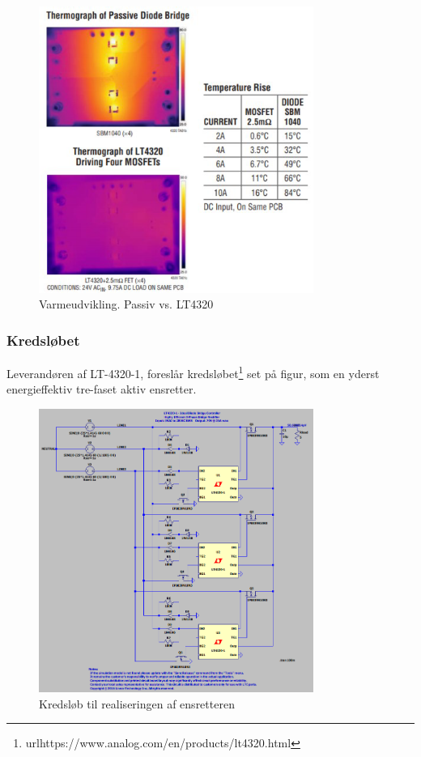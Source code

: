 \begin{figure}[htb]
  \begin{minipage}{\textwidth}
    \centering
    \includegraphics[width=0.8\textwidth]{prens3.png}
    \caption{Varmeudvikling. Passiv vs. LT4320\protect\footnotemark}
    \label{fig:prens3}
  \end{minipage}
\end{figure}

\subsubsection{Kredsløbet}
\label{sec:kredslobet}

Leverandøren af LT-4320-1, foreslår kredsløbet\footnote{url{https://www.analog.com/en/products/lt4320.html}} set på figur, som en yderst energieffektiv tre-faset aktiv ensretter.

\begin{figure}[h]
  \centering
  \includegraphics[width=0.8\textwidth]{prens4.png}
  \caption{Kredsløb til realiseringen af ensretteren}
  \label{fig:prens2}
\end{figure}

